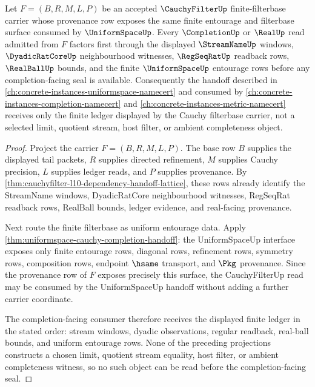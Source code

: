 \begin{theorem}
\label{thm:cauchyfilter-uniformspace-completion-handoff}
Let $F=(B,R,M,L,P)$ be an accepted $\CauchyFilterUp$ finite-filterbase
carrier whose provenance row exposes the same finite entourage and
filterbase surface consumed by $\UniformSpaceUp$. Every $\CompletionUp$ or
$\RealUp$ read admitted from $F$ factors first through the displayed
$\StreamNameUp$ windows, $\DyadicRatCoreUp$ neighbourhood witnesses,
$\RegSeqRatUp$ readback rows, $\RealBallUp$ bounds, and the finite $\UniformSpaceUp$
entourage rows before any completion-facing seal is available. Consequently
the handoff described in \autoref{ch:concrete-instances-uniformspace-namecert}
and consumed by \autoref{ch:concrete-instances-completion-namecert} and
\autoref{ch:concrete-instances-metric-namecert} receives only the finite
ledger displayed by the Cauchy filterbase carrier, not a selected limit,
quotient stream, host filter, or ambient completeness object.
\end{theorem}
\begin{proof}
Project the carrier $F=(B,R,M,L,P)$. The base row $B$ supplies the displayed
tail packets, $R$ supplies directed refinement, $M$ supplies Cauchy
precision, $L$ supplies ledger reads, and $P$ supplies provenance. By
\autoref{thm:cauchyfilter-l10-dependency-handoff-lattice}, these rows already
identify the StreamName windows, DyadicRatCore neighbourhood witnesses,
RegSeqRat readback rows, RealBall bounds, ledger evidence, and real-facing
provenance.

Next route the finite filterbase as uniform entourage data. Apply
\autoref{thm:uniformspace-cauchy-completion-handoff}: the UniformSpaceUp
interface exposes only finite entourage rows, diagonal rows, refinement rows,
symmetry rows, composition rows, endpoint $\hsame$ transport, and $\Pkg$
provenance. Since the provenance row of $F$ exposes precisely this surface,
the CauchyFilterUp read may be consumed by the UniformSpaceUp handoff without
adding a further carrier coordinate.

The completion-facing consumer therefore receives the displayed finite
ledger in the stated order: stream windows, dyadic observations, regular
readback, real-ball bounds, and uniform entourage rows. None of the preceding
projections constructs a chosen limit, quotient stream equality, host filter,
or ambient completeness witness, so no such object can be read before the
completion-facing seal.
\end{proof}


